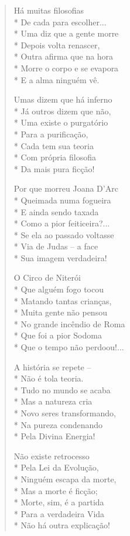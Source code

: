 \begin{verse}
Há muitas filosofias\\*
De cada para escolher...\\*
Uma diz que a gente morre\\*
Depois volta renascer,\\*
Outra afirma que na hora\\*
Morre o corpo e se evapora\\*
E a alma ninguém vê.

Umas dizem que há inferno\\*
Já outros dizem que não,\\*
Uma existe o purgatório\\*
Para a purificação,\\*
Cada tem sua teoria\\*
Com própria filosofia\\*
Da mais pura ficção!

Por que morreu Joana D'Arc\\*
Queimada numa fogueira\\*
E ainda sendo taxada\\*
Como a pior feiticeira?...\\*
Se ela ao passado voltasse\\*
Via de Judas --  a face\\*
Sua imagem verdadeira!

O Circo de Niterói\\*
Que alguém fogo tocou\\*
Matando tantas crianças,\\*
Muita gente não pensou\\*
No grande incêndio de Roma\\*
Que foi a pior Sodoma\\*
Que o tempo não perdoou!...

A história se repete --\\*
Não é tola teoria.\\*
Tudo no mundo se acaba\\*
Mas a natureza cria\\*
Novo seres transformando,\\*
Na pureza condenando\\*
Pela Divina Energia!

Não existe retrocesso\\*
Pela Lei da Evolução,\\*
Ninguém escapa da morte,\\*
Mas a morte é ficção;\\*
Morte, sim, é a partida\\*
Para a verdadeira Vida\\*
Não há outra explicação!


\end{verse}
